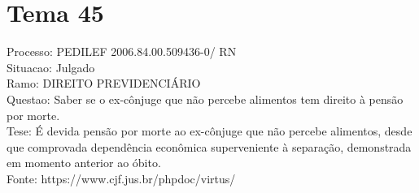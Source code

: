 \documentclass[12pt]{article}
\begin{document}
\section*{Tema 45}
Processo: PEDILEF 2006.84.00.509436-0/ RN\\
Situacao: Julgado\\
Ramo: DIREITO PREVIDENCIÁRIO\\
Questao: Saber se o ex-cônjuge que não percebe alimentos tem direito à pensão por morte.\\
Tese: É devida pensão por morte ao ex-cônjuge que não percebe alimentos, desde que comprovada dependência econômica superveniente à separação, demonstrada em momento anterior ao óbito.\\
Fonte: https://www.cjf.jus.br/phpdoc/virtus/
\end{document}

